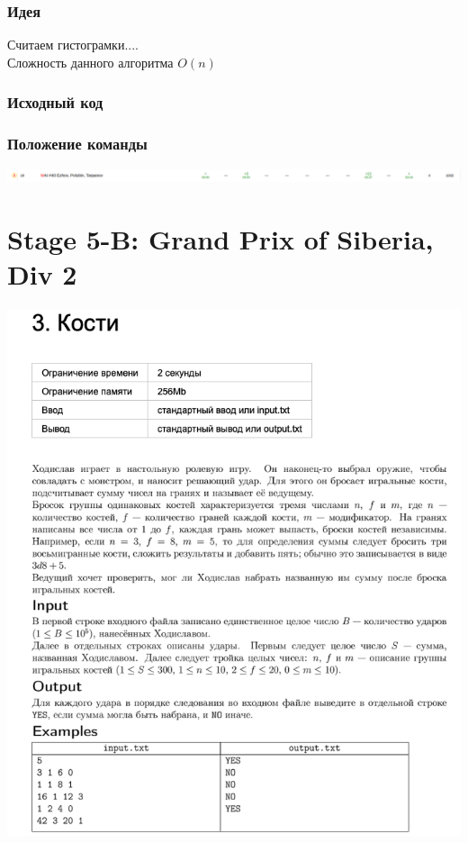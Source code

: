 \documentclass[12pt]{article}
\begin{document}
\subsubsection*{Идея}
Считаем гистограмки....
\\ 
Сложность данного алгоритма $O(n)$
\subsubsection*{Исходный код}

\subsubsection*{Положение команды}
\includegraphics[scale=0.45]{images/4.png}\newline\noindent

\pagebreak
\section{Stage 5-B: Grand Prix of Siberia, Div 2}
\includegraphics[scale=0.75]{statements/5_3.png}
\end{document}
